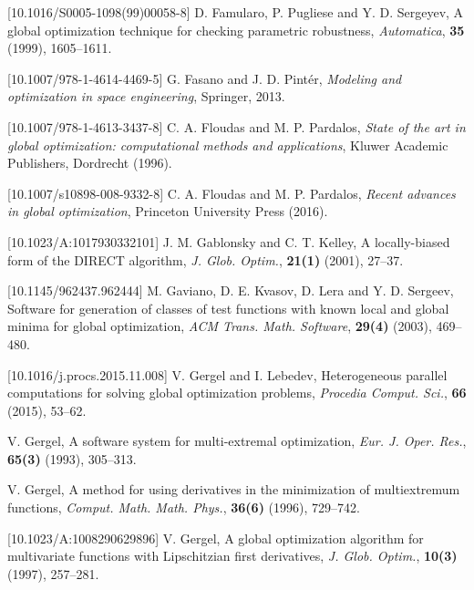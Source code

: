 \documentclass{aims}
\theoremstyle{definition}
\begin{document}
\begin{thebibliography}{10}
[10.1016/S0005-1098(99)00058-8]
\newblock D. Famularo, P. Pugliese and Y. D. Sergeyev,
\newblock A global optimization technique for checking parametric robustness,
\newblock \emph{Automatica}, \textbf{35} (1999), 1605--1611.

[10.1007/978-1-4614-4469-5]
\newblock G. Fasano and J. D. Pint\'er,
\newblock \emph{Modeling and optimization in space engineering},
\newblock Springer, 2013.

[10.1007/978-1-4613-3437-8]
\newblock C. A. Floudas and M. P. Pardalos,
\newblock \emph{State of the art in global optimization: computational methods and applications},
\newblock Kluwer Academic Publishers, Dordrecht (1996).

[10.1007/s10898-008-9332-8]
\newblock C. A. Floudas and M. P. Pardalos,
\newblock \emph{Recent advances in global optimization},
\newblock Princeton University Press (2016).

[10.1023/A:1017930332101]
\newblock J. M. Gablonsky and C. T. Kelley,
\newblock A locally-biased form of the DIRECT algorithm,
\newblock \emph{J. Glob. Optim.}, \textbf{21(1)} (2001), 27--37.

[10.1145/962437.962444]
\newblock M. Gaviano, D. E. Kvasov, D. Lera and Y. D. Sergeev,
\newblock Software for generation of classes of test functions with known local and global minima for global optimization,
\newblock \emph{ACM Trans. Math. Software}, \textbf{29(4)} (2003), 469--480.

[10.1016/j.procs.2015.11.008]
\newblock V. Gergel and I. Lebedev,
\newblock Heterogeneous parallel computations for solving global optimization problems,
\newblock \emph{Procedia Comput. Sci.}, \textbf{66} (2015), 53--62.

\newblock V. Gergel,
\newblock A software system for multi-extremal optimization,
\newblock \emph{Eur. J. Oper. Res.}, \textbf{65(3)} (1993), 305--313.

\newblock V. Gergel,
\newblock A method for using derivatives in the minimization of multiextremum functions,
\newblock \emph{Comput. Math. Math. Phys.}, \textbf{36(6)} (1996), 729--742.

[10.1023/A:1008290629896]
\newblock V. Gergel,
\newblock A global optimization algorithm for multivariate functions with Lipschitzian first derivatives,
\newblock \emph{J. Glob. Optim.}, \textbf{10(3)} (1997), 257--281.


\end{thebibliography}
\end{document}
